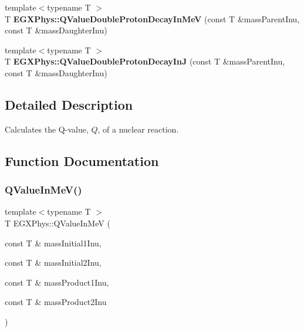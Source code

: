 \begin{DoxyCompactItemize}
\item 
\mbox{\label{group___e_g_x_phys-_q_value_ga4a57c8901e92918f08bee52493b81c59}} 
{\footnotesize template$<$typename T $>$ }\\T {\bfseries E\+G\+X\+Phys\+::\+Q\+Value\+Double\+Proton\+Decay\+In\+MeV} (const T \&mass\+Parent\+Inu, const T \&mass\+Daughter\+Inu)
\item 
\mbox{\label{group___e_g_x_phys-_q_value_ga64a3867f65de5586feab99527bb03d31}} 
{\footnotesize template$<$typename T $>$ }\\T {\bfseries E\+G\+X\+Phys\+::\+Q\+Value\+Double\+Proton\+Decay\+InJ} (const T \&mass\+Parent\+Inu, const T \&mass\+Daughter\+Inu)
\end{DoxyCompactItemize}


\subsection{Detailed Description}
Calculates the Q-\/value, $Q$, of a nuclear reaction. 

\subsection{Function Documentation}
\mbox{\label{group___e_g_x_phys-_q_value_ga9de3868818a3548b4a4ab42f8c17278d}} 
\subsubsection{\texorpdfstring{Q\+Value\+In\+Me\+V()}{QValueInMeV()}}
{\footnotesize\ttfamily template$<$typename T $>$ \\
T E\+G\+X\+Phys\+::\+Q\+Value\+In\+MeV (\begin{DoxyParamCaption}\item[{const T \&}]{mass\+Initial1\+Inu,  }\item[{const T \&}]{mass\+Initial2\+Inu,  }\item[{const T \&}]{mass\+Product1\+Inu,  }\item[{const T \&}]{mass\+Product2\+Inu }\end{DoxyParamCaption})}



